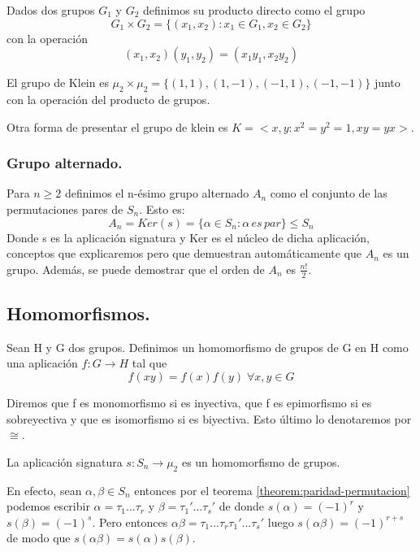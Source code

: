 \begin{definition}
Dados dos grupos $G_1$ y $G_2$ definimos su producto directo como el grupo $$G_1 \times G_2 = \{(x_1,x_2):x_1 \in G_1,x_2 \in G_2\}$$ con la operación $$(x_1,x_2)(y_1,y_2) = (x_1y_1,x_2y_2)$$
\end{definition}

El grupo de Klein es $\mu_2 \times \mu_2 = \{(1,1),(1,-1),(-1,1),(-1,-1)\}$ junto con la operación del producto de grupos.

Otra forma de presentar el grupo de klein es $K = <x,y : x^2 = y^2 = 1, xy = yx>$.

\subsubsection{Grupo alternado.}

Para $n \ge 2$ definimos el n-ésimo grupo alternado $A_n$ como el conjunto de las permutaciones pares de $S_n$. Esto es: $$A_n = Ker(s) = \{\alpha \in S_n : \alpha \, es \, par\} \le S_n$$ Donde s es la aplicación signatura y Ker es el núcleo de dicha aplicación, conceptos que explicaremos pero que demuestran automáticamente que $A_n$ es un grupo. Además, se puede demostrar que el orden de $A_n$ es $\frac{n!}{2}$.

\subsection{Homomorfismos.}

\begin{definition}
Sean H y G dos grupos. Definimos un homomorfismo de grupos de G en H como una aplicación $f:G \rightarrow H$ tal que $$f(xy) = f(x)f(y) \; \forall x,y \in G$$

Diremos que f es monomorfismo si es inyectiva, que f es epimorfismo si es sobreyectiva y que es isomorfismo si es biyectiva. Esto último lo denotaremos por $\cong$.
\end{definition}

\begin{example}
La aplicación signatura $s:S_n \rightarrow \mu_2$ es un homomorfismo de grupos.

En efecto, sean $\alpha,\beta \in S_n$ entonces por el teorema \ref{theorem:paridad-permutacion} podemos escribir $\alpha = \tau_1...\tau_r$ y $\beta = \tau_1'...\tau_s'$ de donde $s(\alpha) = (-1)^r$ y $s(\beta) = (-1)^s$. Pero entonces $\alpha\beta = \tau_1...\tau_r\tau_1'...\tau_s'$ luego $s(\alpha\beta) = (-1)^{r+s}$ de modo que $s(\alpha\beta) = s(\alpha)s(\beta)$.
\end{example}

